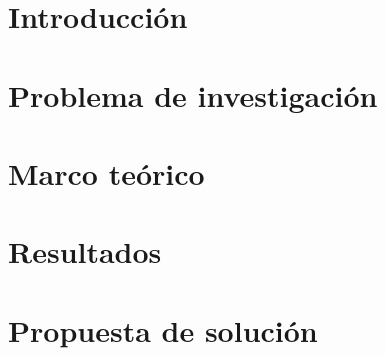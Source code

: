 \documentclass[letterpaper, oneside, openright, 12pt]{book}
\begin{document}
\frontmatter
\setcounter{page}{1}
  
  \clearpage %
  \thispagestyle{empty} %

  
  \clearpage %
  \thispagestyle{empty} %

  \renewcommand*{\thepage}{}

  \tableofcontents
  \cleardoublepage %

\mainmatter
\setcounter{page}{1}
\renewcommand*{\thepage}{\arabic{page}}

  \chapter*{Introducción}
  
  \newpage %

  \chapter{Problema de investigación}
  
  \newpage %

  \chapter{Marco teórico}
  
  \newpage %

  \chapter{Resultados}
  
  \newpage %

  \chapter{Propuesta de solución}
  
  \newpage %
\end{document}
